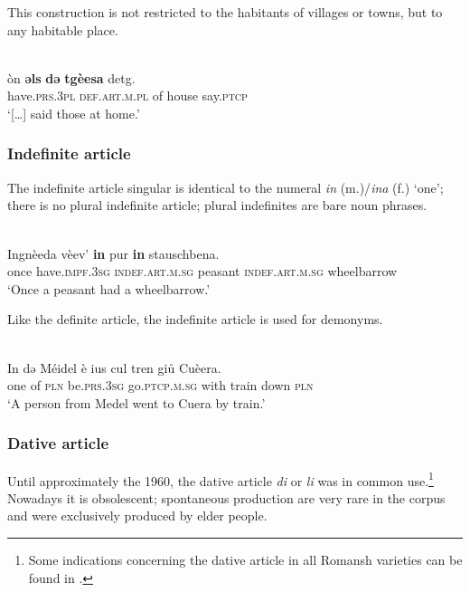 This construction is not restricted to the habitants of villages or towns, but to any habitable place.

\ea\label{}
\\%
\gll […] òn \textbf{əls} \textbf{də} \textbf{tgèesa} detg.\\
[…] have.\textsc{prs.3pl} \textsc{def.art.m.pl} of house say.\textsc{ptcp}\\
\glt `[…] said those at home.'
\z



\subsubsection{Indefinite article}
The indefinite article singular is identical to the numeral \textit{in} (m.)/\textit{ina} (f.) ‘one’; there is no plural indefinite article; plural indefinites are bare noun phrases.

\ea\label{}
\\
\gll Ingnèeda vèev’ \textbf{in} pur \textbf{in} stauschbena.\\
     once have.\textsc{impf.3sg} \textsc{indef.art.m.sg} peasant \textsc{indef.art.m.sg} wheelbarrow \\
\glt `Once a peasant had a wheelbarrow.'
\z


Like the definite article, the indefinite article is used for demonyms.

\ea\label{}
\\
\gll   In dǝ Méidel è ius cul tren giů Cuèera.\\
     one of \textsc{pln} be.\textsc{prs.3sg} go.\textsc{ptcp.m.sg} with train down \textsc{pln}\\
\glt `A person from Medel went to Cuera by train.'
\z

\subsubsection{Dative article} 

Until approximately the 1960, the dative article \textit{di} or \textit{li} was in common use.\footnote{Some indications concerning the dative article in all Romansh varieties can be found in \citet{Linder1987}.} Nowadays it is obsolescent; spontaneous production are very rare in the corpus and were exclusively produced by elder people.

